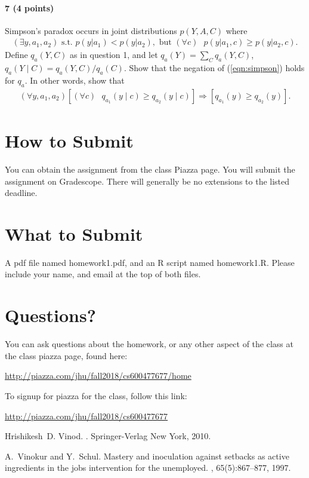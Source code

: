 \documentclass[11pt]{article}
\begin{document}
\paragraph{7 (4 points)}
Simpson's paradox occurs in joint distributions $p(Y,A,C)$ where
\begin{align}
(\exists y, a_1, a_2) \text{ s.t. }p(y | a_1) < p(y | a_2), \text{ but } (\forall c) \text{ } p(y | a_1,c) \geq p(y | a_2,c).
\label{eqn:simpson}
\end{align}
Define $q_a(Y,C)$ as in question 1, and let $q_a(Y) = \sum_C q_a(Y,C)$, $q_a(Y \mid C) = q_a(Y,C) / q_a(C)$.
Show that the negation of (\ref{eqn:simpson}) holds for $q_a$.  In other words, show that
\begin{align*}
(\forall y, a_1, a_2) [ (\forall c) \text{ }q_{a_1}(y \mid c) \geq q_{a_2}(y \mid c) ] \Rightarrow [q_{a_1}(y) \geq q_{a_2}(y) ].
\end{align*}

\section{How to Submit}

You can obtain the assignment from the class Piazza page. You will submit the assignment on Gradescope. There will generally be no extensions to the listed deadline.

\section{What to Submit}
A pdf file named homework1.pdf, and an R script named homework1.R.  Please include your name, and email at the top of both files.

\section{Questions?}
You can ask questions about the homework, or any other aspect of the class at the class piazza page, found here:
\begin{center}
\href{http://piazza.com/jhu/fall2018/cs600477677/home}{http://piazza.com/jhu/fall2018/cs600477677/home}
\end{center}

To signup for piazza for the class, follow this link:
\begin{center}
\href{http://piazza.com/jhu/fall2018/cs600477677}{http://piazza.com/jhu/fall2018/cs600477677}
\end{center}

\begin{thebibliography}{1}

Hrishikesh~D. Vinod.
.
\newblock Springer-Verlag New York, 2010.

A.~Vinokur and Y.~Schul.
\newblock Mastery and inoculation against setbacks as active ingredients in the
  jobs intervention for the unemployed.
, 65(5):867--877,
  1997.

\end{thebibliography}
\end{document}
